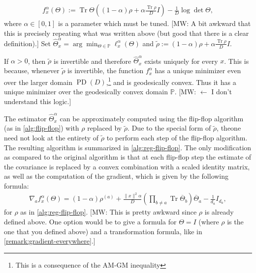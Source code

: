 \documentclass[aos]{imsart}
\theoremstyle{definition}
\numberwithin{equation}{section}
\DeclareMathOperator{\tr}{Tr}
\DeclareMathOperator{\PD}{PD}
\renewcommand{\P}{{\mathbb{P}}}
\newcommand{\otheta}{\overline{\Theta}}
\newcommand{\samp}{x}
\newcommand{\MW}[1]{{\color{red}[MW: #1]}}
\newcommand{\MW}[1]{{}}
\begin{document}
\begin{align*}
  f_{\samp}^\alpha(\Theta)
  :=  \tr \Theta \left((1 - \alpha) \rho + \alpha \frac{\tr \rho}{D} I\right) - \frac{1}{D}\log\det\Theta,
\end{align*}
where $\alpha \in [0,1]$ is a parameter which must be tuned.
\MW{A bit awkward that this is precisely repeating what was written above (but good that there is a clear definition).}
Set $\widehat{\Theta}^\alpha_x = \arg\min_{\Theta \in \P} \ell^\alpha_\samp(\Theta)$ and  $\tilde{\rho} := (1- \alpha) \rho + \alpha \frac{\tr \rho}{D} I.$

If $\alpha > 0$, then $\tilde{\rho}$ is invertible and therefore $\widehat{\Theta}^\alpha_x$ exists uniquely for every $x$.
This is because, whenever $\tilde{\rho}$ is invertible, the function $f_{\samp}^\alpha$ has a unique minimizer even over the larger domain $\PD(D)$,\footnote{This is a consequence of the AM-GM inequality} and is geodesically convex.
Thus it has a unique minimizer over the geodesically convex domain $\P$.
\MW{$\leftarrow$ I don't understand this logic.}

The estimator $\widehat{\Theta}^\alpha_x$ can be approximately computed using the flip-flop algorithm (as in \cref{alg:flip-flop}) with $\rho$ replaced by $\tilde{\rho}$.
Due to the special form of $\tilde{\rho}$, theone need not look at the entirety of $\tilde{\rho}$ to perform each step of the flip-flop algorithm.
The resulting algorithm is summarized in \cref{alg:reg-flip-flop}.
The only modification as compared to the original algorithm is that at each flip-flop step the estimate of the covariance is replaced by a convex combination with a scaled identity matrix, as well as the computation of the gradient, which is given by the following formula:
\begin{align}\nabla_a f^\alpha_\samp(\Theta) = (1 - \alpha) \rho^{(a)} + \frac{\|x\|^2 \alpha}{D}  (\prod_{b \neq a} \tr \otheta_b ) \otheta_a - \frac{1}{d_a} I_{d_a}, \label{eq:reg-like}
\end{align}
for $\rho$ as in \cref{alg:reg-flip-flop}.
\MW{This is pretty awkward since $\rho$ is already defined above. One option would be to give a formula for $\Theta=I$ (where $\rho$ is the one that you defined above) and a transformation formula, like in \cref{remark:gradient-everywhere}.}
\end{document}
